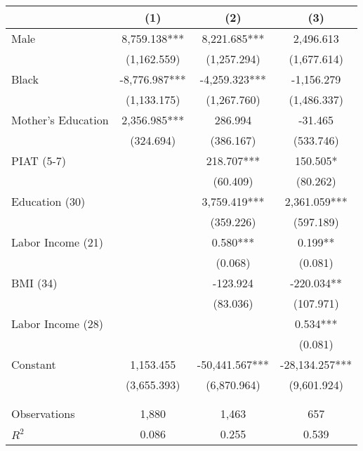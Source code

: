 \begin{tabular}{lccc} \hline
 & (1) & (2) & (3) \\ \midrule
Male & 8,759.138*** & 8,221.685*** & 2,496.613 \\
 & (1,162.559) & (1,257.294) & (1,677.614) \\
Black & -8,776.987*** & -4,259.323*** & -1,156.279 \\
 & (1,133.175) & (1,267.760) & (1,486.337) \\
Mother's Education & 2,356.985*** & 286.994 & -31.465 \\
 & (324.694) & (386.167) & (533.746) \\
PIAT (5-7) &  & 218.707*** & 150.505* \\
 &  & (60.409) & (80.262) \\
Education (30) &  & 3,759.419*** & 2,361.059*** \\
 &  & (359.226) & (597.189) \\
Labor Income (21) &  & 0.580*** & 0.199** \\
 &  & (0.068) & (0.081) \\
BMI (34) &  & -123.924 & -220.034** \\
 &  & (83.036) & (107.971) \\
Labor Income (28) &  &  & 0.534*** \\
 &  &  & (0.081) \\
Constant & 1,153.455 & -50,441.567*** & -28,134.257*** \\
 & (3,655.393) & (6,870.964) & (9,601.924) \\
 &  &  &  \\ \\ \midrule
Observations & 1,880 & 1,463 & 657 \\
$R^2$ & 0.086 & 0.255 & 0.539 \\ \bottomrule
\end{tabular}
